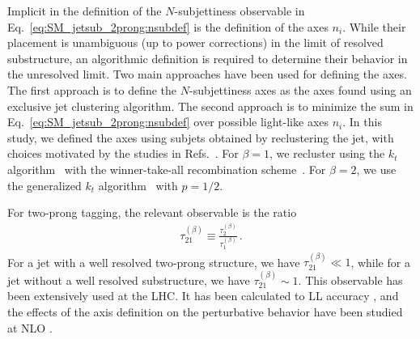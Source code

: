 Implicit in the definition of the $N$-subjettiness observable in
Eq.~\eqref{eq:SM_jetsub_2prong:nsubdef} is the definition of the axes $n_i$.
%
While their
placement is unambiguous (up to power corrections) in the limit of resolved substructure, an algorithmic definition is required to
determine their behavior in the unresolved limit.
%
Two main approaches
have been used for defining the axes.
%
The first approach is to define
the $N$-subjettiness axes as the axes found using an exclusive jet
clustering algorithm. The second approach is to minimize the sum in
Eq.~\eqref{eq:SM_jetsub_2prong:nsubdef} over possible light-like axes $n_i$.
%
In this study, we defined the axes using subjets obtained by reclustering the jet, with choices motivated by the studies in Refs.~\cite{Stewart:2015waa,Dasgupta:2015lxh}.
%
For $\beta = 1$, we recluster using the $k_t$ algorithm~\cite{Catani:1993hr} with the
  winner-take-all recombination scheme~\cite{Larkoski:2014uqa}.
%
For $\beta = 2$, we use the generalized $k_t$ algorithm~\cite{Cacciari:2011ma} with $p=1/2$.

For two-prong tagging, the relevant observable is the ratio \cite{Thaler:2010tr}
\begin{align}
\tau_{21}^{(\beta)}\equiv \frac{\tau_{2}^{(\beta)}}{\tau_{1}^{(\beta)}}\,.
\end{align}
For a jet with a well resolved two-prong structure, we have $\tau_{21}^{(\beta)}\ll 1$, while for a jet without a well resolved substructure, we have $\tau_{21}^{(\beta)}\sim 1$.
%
This observable has been extensively used at the LHC.
%
It has been calculated to LL accuracy \cite{Dasgupta:2015lxh}, and the effects of the axis definition on the perturbative behavior have been studied at NLO \cite{Larkoski:2015uaa}.


